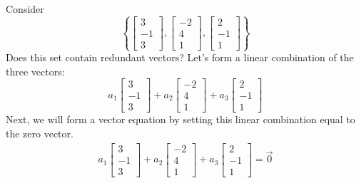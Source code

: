 \documentclass{ximera}
\begin{document}
\begin{initprob}\label{init:onlytrivialrelation}
Consider
$$\left\{\begin{bmatrix}3\\-1\\3\end{bmatrix}, \begin{bmatrix}-2\\4\\1\end{bmatrix},\begin{bmatrix}2\\-1\\1\end{bmatrix}\right\}$$
Does this set contain redundant vectors?  Let's form a linear combination of the three vectors:
$$a_1\begin{bmatrix}3\\-1\\3\end{bmatrix}+a_2 \begin{bmatrix}-2\\4\\1\end{bmatrix}+a_3\begin{bmatrix}2\\-1\\1\end{bmatrix}$$
Next, we will form a vector equation by setting this linear combination equal to the zero vector.
\begin{align}\label{eq:onlytrivialrelation1}a_1\begin{bmatrix}3\\-1\\3\end{bmatrix}+a_2 \begin{bmatrix}-2\\4\\1\end{bmatrix}+a_3\begin{bmatrix}2\\-1\\1\end{bmatrix}=\vec{0}\end{align}


\end{initprob}
\end{document}
